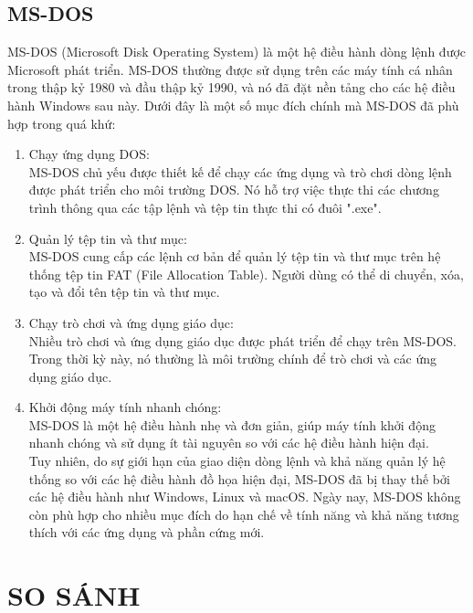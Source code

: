 \documentclass[12pt,a4paper]{article}
\begin{document}
\subsection{MS-DOS}
MS-DOS (Microsoft Disk Operating System) là một hệ điều hành dòng lệnh được Microsoft phát triển. MS-DOS thường được sử dụng trên các máy tính cá nhân trong thập kỷ 1980 và đầu thập kỷ 1990, và nó đã đặt nền tảng cho các hệ điều hành Windows sau này. Dưới đây là một số mục đích chính mà MS-DOS đã phù hợp trong quá khứ:
\begin{enumerate}
	\item Chạy ứng dụng DOS:\\
	MS-DOS chủ yếu được thiết kế để chạy các ứng dụng và trò chơi dòng lệnh được phát triển cho môi trường DOS. Nó hỗ trợ việc thực thi các chương trình thông qua các tập lệnh và tệp tin thực thi có đuôi ".exe".
	\item Quản lý tệp tin và thư mục:\\
	MS-DOS cung cấp các lệnh cơ bản để quản lý tệp tin và thư mục trên hệ thống tệp tin FAT (File Allocation Table). Người dùng có thể di chuyển, xóa, tạo và đổi tên tệp tin và thư mục.
	\item Chạy trò chơi và ứng dụng giáo dục:\\
	Nhiều trò chơi và ứng dụng giáo dục được phát triển để chạy trên MS-DOS. Trong thời kỳ này, nó thường là môi trường chính để trò chơi và các ứng dụng giáo dục.
	\item Khởi động máy tính nhanh chóng:\\
	MS-DOS là một hệ điều hành nhẹ và đơn giản, giúp máy tính khởi động nhanh chóng và sử dụng ít tài nguyên so với các hệ điều hành hiện đại.\\
	
	Tuy nhiên, do sự giới hạn của giao diện dòng lệnh và khả năng quản lý hệ thống so với các hệ điều hành đồ họa hiện đại, MS-DOS đã bị thay thế bởi các hệ điều hành như Windows, Linux và macOS. Ngày nay, MS-DOS không còn phù hợp cho nhiều mục đích do hạn chế về tính năng và khả năng tương thích với các ứng dụng và phần cứng mới.
\end{enumerate}	

\section{SO SÁNH}
\end{document}
